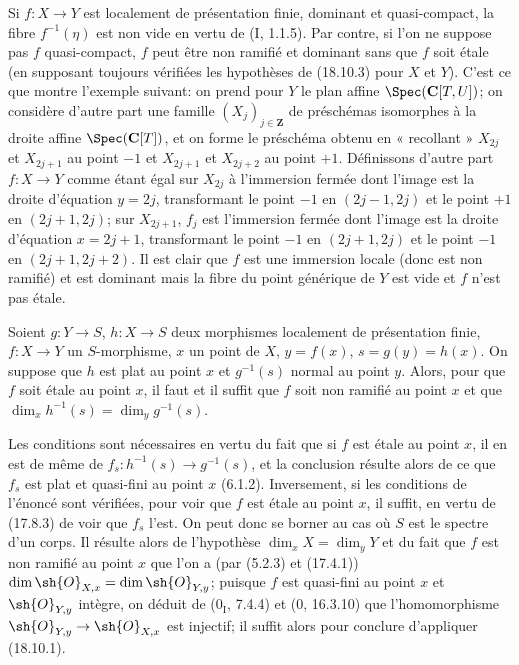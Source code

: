 
\begin{remark}[18.10.3.1]
\label{IV.18.10.3.1}
Si $f:X\to Y$ est localement de présentation finie, dominant et quasi-compact, la fibre $f^{-1}(\eta)$ est non vide en vertu de (I, 1.1.5). Par contre, si l'on ne suppose pas $f$ quasi-compact, $f$ peut être non ramifié et dominant sans que $f$ soit étale (en supposant toujours vérifiées les hypothèses de (18.10.3) pour $X$ et $Y$). C'est ce que montre l'exemple suivant: on prend pour $Y$ le plan affine $\Spec(\mathbf C[T,U])$; on considère d'autre part une famille $(X_j)_{j\in\mathbf Z}$ de préschémas isomorphes à la droite affine $\Spec(\mathbf C[T])$, et on forme le préschéma obtenu en « recollant » $X_{2j}$ et $X_{2j+1}$ au point $-1$ et $X_{2j+1}$ et $X_{2j+2}$ au point $+1$. Définissons d'autre part $f:X\to Y$ comme étant égal sur $X_{2j}$ à l'immersion fermée dont l'image est la droite d'équation $y=2j$, transformant le point $-1$ en $(2j-1,2j)$ et le point $+1$ en $(2j+1,2j)$; sur $X_{2j+1}$, $f_j$ est l'immersion fermée dont l'image est la droite d'équation $x=2j+1$, transformant le point $-1$ en $(2j+1,2j)$ et le point $-1$ en $(2j+1,2j+2)$. Il est clair que $f$ est une immersion locale (donc est non ramifié) et est dominant mais la fibre du point générique de $Y$ est vide et $f$ n'est pas étale.
\end{remark}

\begin{corollary}[18.10.4]
\label{IV.18.10.4}
Soient $g:Y\to S$, $h:X\to S$ deux morphismes localement de présentation finie, $f:X\to Y$ un $S$-morphisme, $x$ un point de $X$, $y=f(x)$, $s=g(y)=h(x)$. On suppose que $h$ est plat au point $x$ et $g^{-1}(s)$ normal au point $y$. Alors, pour que $f$ soit étale au point $x$, il faut et il suffit que $f$ soit non ramifié au point $x$ et que $\dim_xh^{-1}(s)=\dim_yg^{-1}(s)$.
\end{corollary}

Les conditions sont nécessaires en vertu du fait que si $f$ est étale au point $x$, il en est de même de $f_s:h^{-1}(s)\to g^{-1}(s)$, et la conclusion résulte alors de ce que $f_s$ est plat et quasi-fini au point $x$ (6.1.2). Inversement, si les conditions de l'énoncé sont vérifiées, pour voir que $f$ est étale au point $x$, il suffit, en vertu de (17.8.3) de voir que $f_s$ l'est. On peut donc se borner au cas où $S$ est le spectre d'un corps. Il résulte alors de l'hypothèse $\dim_xX=\dim_yY$ et du fait que $f$ est non ramifié au point $x$ que l'on a (par (5.2.3) et (17.4.1)) $\dim\sh{O}_{X,x}=\dim\sh{O}_{Y,y}$; puisque $f$ est quasi-fini au point $x$ et $\sh{O}_{Y,y}$ intègre, on déduit de ($0_{\mathrm I}$, 7.4.4) et ($0$, 16.3.10) que l'homomorphisme $\sh{O}_{Y,y}\to\sh{O}_{X,x}$ est injectif; il suffit alors pour conclure d'appliquer (18.10.1).

